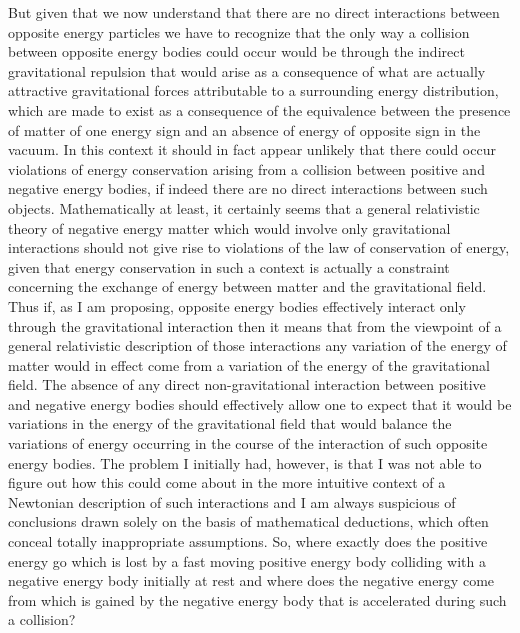 \documentclass[notitlepage,12pt]{report}
\begin{document}
But given that we now understand that there are no direct interactions between opposite energy particles we have to recognize that the only way a collision between opposite energy bodies could occur would be through the indirect gravitational repulsion that would arise as a consequence of what are actually attractive gravitational forces attributable to a surrounding energy distribution, which are made to exist as a consequence of the equivalence between the presence of matter of one energy sign and an absence of energy of opposite sign in the vacuum. In this context it should in fact appear unlikely that there could occur violations of energy conservation arising from a collision between positive and negative energy bodies, if indeed there are no direct interactions between such objects. Mathematically at least, it certainly seems that a general relativistic theory of negative energy matter which would involve only gravitational interactions should not give rise to violations of the law of conservation of energy, given that energy conservation in such a context is actually a constraint concerning the exchange of energy between matter and the gravitational field. Thus if, as I am proposing, opposite energy bodies effectively interact only through the gravitational interaction then it means that from the viewpoint of a general relativistic description of those interactions any variation of the energy of matter would in effect come from a variation of the energy of the gravitational field. The absence of any direct non-gravitational interaction between positive and negative energy bodies should effectively allow one to expect that it would be variations in the energy of the gravitational field that would balance the variations of energy occurring in the course of the interaction of such opposite energy bodies. The problem I initially had, however, is that I was not able to figure out how this could come about in the more intuitive context of a Newtonian description of such interactions and I am always suspicious of conclusions drawn solely on the basis of mathematical deductions, which often conceal totally inappropriate assumptions. So, where exactly does the positive energy go which is lost by a fast moving positive energy body colliding with a negative energy body initially at rest and where does the negative energy come from which is gained by the negative energy body that is accelerated during such a collision?
\end{document}
